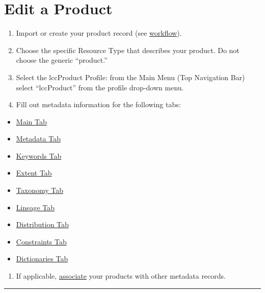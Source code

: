 \documentclass[
]{book}
\providecommand{\tightlist}{%
  \setlength{\itemsep}{0pt}\setlength{\parskip}{0pt}}
\begin{document}
\hypertarget{edit-a-product}{%
\section*{Edit a Product}\label{edit-a-product}}

\begin{enumerate}
\def\labelenumi{\arabic{enumi}.}
\tightlist
\item
  Import or create your product record (see \protect\hyperlink{workflow}{workflow}).
\item
  Choose the specific Resource Type that describes your product. Do not choose the generic ``product.''
\item
  Select the lccProduct Profile: from the Main Menu (Top Navigation Bar) select ``lccProduct'' from the profile drop-down menu.
\item
  Fill out metadata information for the following tabs:
\end{enumerate}

\begin{itemize}
\tightlist
\item
  \protect\hyperlink{product-main}{Main Tab}
\item
  \protect\hyperlink{product-metadata}{Metadata Tab}
\item
  \protect\hyperlink{product-keywords}{Keywords Tab}
\item
  \protect\hyperlink{product-extent}{Extent Tab}
\item
  \protect\hyperlink{product-taxonomy}{Taxonomy Tab}
\item
  \protect\hyperlink{product-lineage}{Lineage Tab}
\item
  \protect\hyperlink{product-distribution}{Distribution Tab}
\item
  \protect\hyperlink{product-constaints}{Constraints Tab}
\item
  \protect\hyperlink{product-dictionary}{Dictionaries Tab}
\end{itemize}

\begin{enumerate}
\def\labelenumi{\arabic{enumi}.}
\setcounter{enumi}{4}
\tightlist
\item
  If applicable, \protect\hyperlink{product-associated}{associate} your products with other metadata records.
\end{enumerate}

\begin{center}\rule{0.5\linewidth}{\linethickness}\end{center}
\end{document}
